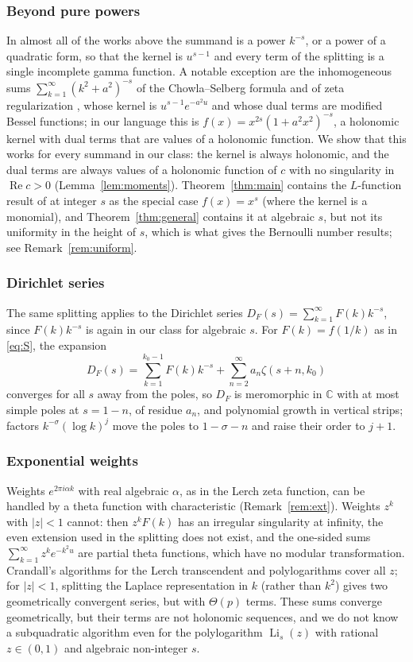 \documentclass[11pt,reqno]{amsart}
\theoremstyle{definition}
\theoremstyle{remark}
\newcommand{\Li}{\operatorname{Li}}
\newcommand{\CC}{\mathbb{C}}
\begin{document}
\subsubsection{Beyond pure powers}
In almost all of the works above the summand is a power $k^{-s}$, or a power of a quadratic form, so that the kernel
is $u^{s-1}$ and every term of the splitting is a single incomplete gamma function. A notable exception are the
inhomogeneous sums $\sum_{k=1}^{\infty} (k^2+a^2)^{-s}$ of the Chowla--Selberg formula and of zeta regularization
\cite{CS67,Eli95,Kir02}, whose kernel is $u^{s-1}e^{-a^2u}$ and whose dual terms are modified Bessel functions; in our
language this is $f(x) = x^{2s}(1+a^2x^2)^{-s}$, a holonomic kernel with dual terms that are values of a holonomic
function. We show that this works for every summand in our class: the kernel is always holonomic, and the dual terms
are always values of a holonomic function of $c$ with no singularity in $\operatorname{Re} c > 0$
(Lemma~\ref{lem:moments}). Theorem~\ref{thm:main} contains the $L$-function result of \cite{Joh21} at integer $s$ as
the special case $f(x) = x^s$ (where the kernel is a monomial), and Theorem~\ref{thm:general} contains it at algebraic
$s$, but not its uniformity in the height of $s$, which is what gives the Bernoulli number results; see
Remark~\ref{rem:uniform}.

\subsubsection{Dirichlet series}
The same splitting applies to the Dirichlet series $D_F(s) = \sum_{k=1}^{\infty}F(k)k^{-s}$, since $F(k)k^{-s}$ is again
in our class for algebraic $s$. For $F(k) = f(1/k)$ as in \eqref{eq:S}, the expansion
\[
  D_F(s) = \sum_{k=1}^{k_0-1}F(k)k^{-s} + \sum_{n=2}^{\infty}a_n\zeta(s+n, k_0)
\]
converges for all $s$ away from the poles, so $D_F$ is meromorphic in $\CC$ with at most simple poles at $s = 1-n$, of residue $a_n$, and polynomial growth in vertical
strips; factors $k^{-\sigma}(\log k)^j$ move the poles to $1 - \sigma - n$ and raise their order to $j+1$. 



\subsubsection{Exponential weights}
Weights $e^{2\pi i\alpha k}$ with real algebraic $\alpha$, as in the Lerch zeta function, can be handled by a theta
function with characteristic (Remark~\ref{rem:ext}). Weights $z^k$ with $|z| < 1$ cannot: then $z^kF(k)$ has an
irregular singularity at infinity, the even extension used in the splitting does not exist, and the one-sided
sums $\sum_{k=1}^{\infty}z^ke^{-k^2u}$ are partial theta functions, which have no modular transformation. Crandall's
algorithms for the Lerch transcendent and polylogarithms \cite{Cra12} cover all $z$; for $|z| < 1$, splitting the
Laplace representation in $k$ (rather than $k^2$) gives two geometrically convergent series, but with $\Theta(p)$
terms. These sums converge geometrically, but
their terms are not holonomic sequences, and we do not know a subquadratic algorithm even for the polylogarithm
$\Li_s(z)$ with rational $z \in (0, 1)$ and algebraic non-integer $s$.
\end{document}
